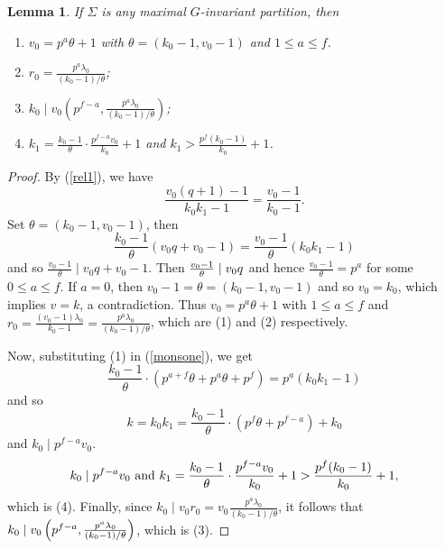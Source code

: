 \documentclass[a4paper,twopage,reqno,12pt]{amsart}
\newtheorem{lemma}[theorem]{Lemma}
\theoremstyle{definition}
\numberwithin{equation}{section}
\renewcommand{\leq}{\leqslant}
\begin{document}
\bigskip

\begin{lemma}
\label{SigmaMax1}If $\Sigma $ is any maximal $G$-invariant partition, then

\begin{enumerate}
\item $v_{0}=p^{a}\theta +1$ with $\theta =\left( k_{0}-1,v_{0}-1\right) $
and $1\leq a\leq f$.

\item $r_{0}=\frac{p^{a}\lambda _{0}}{\left( k_{0}-1\right) /\theta }$;

\item $k_{0}\mid v_{0}\left( p^{f-a},\frac{p^{a}\lambda _{0}}{\left(
k_{0}-1\right) /\theta }\right) $;

\item $k_{1}=\frac{k_{0}-1}{\theta }\cdot \frac{p^{f-a}v_{0}}{k_{0}}+1$ and $%
k_{1}>\frac{p^{f}(k_{0}-1)}{k_{0}}+1$.
\end{enumerate}
\end{lemma}

\begin{proof}
By (\ref{rel1}), we have%
\[
\frac{v_{0}(q+1)-1}{k_{0}k_{1}-1}=\frac{v_{0}-1}{k_{0}-1}\text{.} 
\]%
Set $\theta =(k_{0}-1,v_{0}-1)$, then 
\begin{equation}\label{monsone}
\frac{k_{0}-1}{\theta }(v_{0}q+v_{0}-1)=\frac{v_{0}-1}{\theta }%
(k_{0}k_{1}-1) 
\end{equation}
and so $\frac{v_{0}-1}{\theta }\mid v_{0}q+v_{0}-1$. Then $\frac{v_{0}-1}{%
\theta }\mid v_{0}q$ and hence $\frac{v_{0}-1}{\theta }=p^{a}$ for some $0\leq a\leq f$. If $a=0$, then $v_{0}-1=\theta =(k_{0}-1,v_{0}-1)$ and so $%
v_{0}=k_{0}$, which implies $v=k$, a contradiction. Thus $v_{0}=p^{a}\theta
+1$ with $1\leq a\leq f$ and $r_{0}=\frac{(v_{0}-1)\lambda_{0}}{k_{0}-1}=\frac{p^{a}\lambda _{0}}{\left( k_{0}-1\right) /\theta }$, which are (1) and (2) respectively.

Now, substituting (1) in (\ref{monsone}), we get
\begin{equation*}
\frac{k_{0}-1}{\theta }\cdot \left( p^{a+f}\theta +p^{a}\theta +p^{f}\right)
=p^{a}(k_{0}k_{1}-1)
\end{equation*}%
and so%
\[
k=k_{0}k_{1}=\frac{k_{0}-1}{\theta }\cdot \left( p^{f}\theta
+p^{f-a}\right) +k_{0} 
\]%
and $k_{0}\mid p^{f-a}v_{0}$. 
\[
k_{0}\mid p^{f-a}v_{0}\text{ and }k_{1}=\frac{k_{0}-1}{\theta }\cdot \frac{%
p^{f-a}v_{0}}{k_{0}}+1>\frac{p^{f}(k_{0}-1)}{k_{0}}+1\text{,} 
\]%
which is (4). %
Finally, since $k_{0}\mid v_{0}r_{0}= v_{0}\frac{p^{a}\lambda _{0}}{\left( k_{0}-1\right)
/\theta }$, it follows that $k_{0}\mid v_{0}\left( p^{f-a},\frac{%
p^{a}\lambda _{0}}{\left( k_{0}-1\right) /\theta }\right)$, which is (3).

\end{proof}
\end{document}
